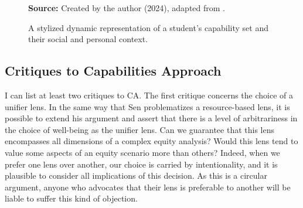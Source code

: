 \begin{figure}[ht!]
\centering

\caption{\textmd{A stylized dynamic representation of a student's capability set and their social and personal context.}}
\label{fig:grouped-robeyns-representation}

\par\medskip\ABNTEXfontereduzida\selectfont\textbf{Source:} Created by the author (2024), adapted from .
\end{figure}

\subsection{Critiques to Capabilities Approach}
\label{sen-ss:critiques}

I can list at least two critiques to \gls{CA}. The first critique concerns the choice of a unifier lens. In the same way that Sen problematizes a resource-based lens, it is possible to extend his argument and assert that there is a level of arbitrariness in the choice of well-being as the unifier lens. Can we guarantee that this lens encompasses all dimensions of a complex equity analysis? Would this lens tend to value some aspects of an equity scenario more than others? Indeed, when we prefer one lens over another, our choice is carried by intentionality, and it is plausible to consider all implications of this decision. As this is a circular argument, anyone who advocates that their lens is preferable to another will be liable to suffer this kind of objection.

